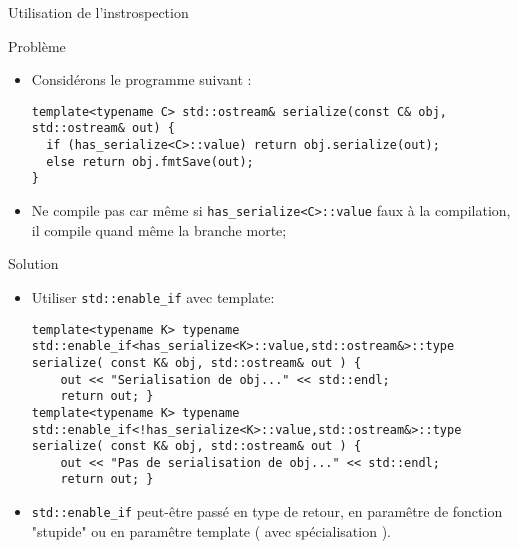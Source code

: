 \documentclass[handout,10pt]{beamer}
\begin{document}
\begin{frame}[fragile]{Utilisation de l'instrospection}
\tiny
\begin{alertblock}{Problème}
\begin{itemize}
\item Considérons le programme suivant :
\begin{lstlisting}
template<typename C> std::ostream& serialize(const C& obj, std::ostream& out) {
  if (has_serialize<C>::value) return obj.serialize(out);
  else return obj.fmtSave(out);
}
\end{lstlisting}
\item Ne compile pas car même si \lstinline$has_serialize<C>::value$ faux à la compilation,
il compile quand même la branche morte;
\end{itemize}
\end{alertblock}
\begin{exampleblock}{Solution}
\begin{itemize}
\item Utiliser \lstinline$std::enable_if$ avec template:
\begin{lstlisting}
template<typename K> typename std::enable_if<has_serialize<K>::value,std::ostream&>::type
serialize( const K& obj, std::ostream& out ) { 
    out << "Serialisation de obj..." << std::endl; 
    return out; }
template<typename K> typename std::enable_if<!has_serialize<K>::value,std::ostream&>::type
serialize( const K& obj, std::ostream& out ) { 
    out << "Pas de serialisation de obj..." << std::endl; 
    return out; }
\end{lstlisting}
\item \lstinline$std::enable_if$ peut-être passé en type de retour, en paramêtre de fonction "stupide" ou en paramêtre
template ( avec spécialisation ).
\end{itemize}
\end{exampleblock}
\end{frame}
\end{document}
